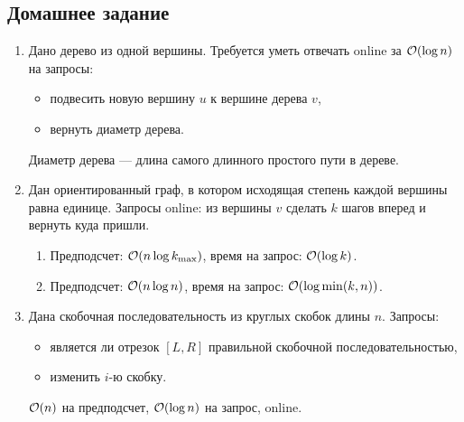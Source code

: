 

\subsection{Домашнее задание}
\begin{enumerate}
	
  \item
	Дано дерево из одной вершины. Требуется уметь отвечать online за $\mathcal{O}(\log n)$ на запросы:
	\begin{itemize}
	  \item подвесить новую вершину $u$ к вершине дерева $v$,
	  \item вернуть диаметр дерева.
	\end{itemize}
	Диаметр дерева --- длина самого длинного простого пути в дереве.
	
  \item
    Дан ориентированный граф, в котором исходящая степень каждой вершины
	равна единице. Запросы online: из вершины $v$ сделать $k$ шагов вперед и вернуть куда пришли.
	\begin{enumerate}
	  \item Предподсчет: $\mathcal{O}(n \log k_{\max})$, время на запрос: $\mathcal{O}(\log k)$.
	  \item Предподсчет: $\mathcal{O}(n \log n)$, время на запрос: $\mathcal{O}(\log \min(k, n))$.      
	\end{enumerate}
	
  \item
	Дана скобочная последовательность из круглых скобок длины $n$. Запросы:
	\begin{itemize}
	    \item является ли отрезок $[L, R]$ правильной скобочной последовательностью,
	    \item изменить $i$-ю скобку.
	\end{itemize}
	$\mathcal{O}(n)$ на предподсчет, $\mathcal{O}(\log n)$ на запрос, online.


\end{enumerate}
